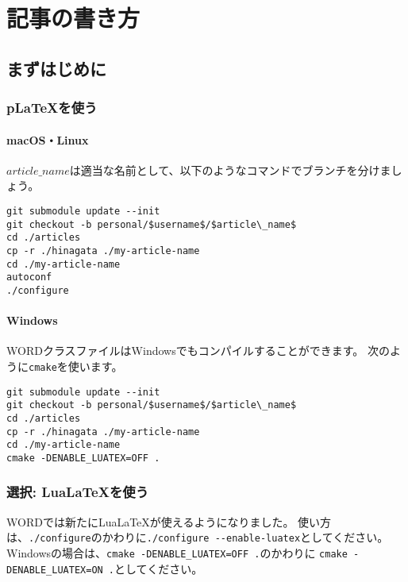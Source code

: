 \documentclass{word}
\subtitle{ヘッダの見出し}
\author{ほげ}
\begin{document}
\chapter{記事の書き方}

\section{まずはじめに}

\subsection{p\LaTeX を使う}

\subsubsection{macOS・Linux}

$article\_name$は適当な名前として、以下のようなコマンドでブランチを分けましょう。

\begin{lstlisting}[mathescape]
git submodule update --init
git checkout -b personal/$username$/$article\_name$
cd ./articles
cp -r ./hinagata ./my-article-name
cd ./my-article-name
autoconf
./configure
\end{lstlisting}

\subsubsection{Windows}

WORDクラスファイルはWindowsでもコンパイルすることができます。
次のように\lstinline|cmake|を使います。

\begin{lstlisting}[mathescape]
git submodule update --init
git checkout -b personal/$username$/$article\_name$
cd ./articles
cp -r ./hinagata ./my-article-name
cd ./my-article-name
cmake -DENABLE_LUATEX=OFF .
\end{lstlisting}

\subsection{選択: Lua\LaTeX を使う}

WORDでは新たにLua\LaTeX が使えるようになりました。
使い方は、\lstinline|./configure|のかわりに\lstinline|./configure --enable-luatex|としてください。
Windowsの場合は、\lstinline|cmake -DENABLE_LUATEX=OFF .|のかわりに
\lstinline|cmake -DENABLE_LUATEX=ON .|としてください。
\end{document}
